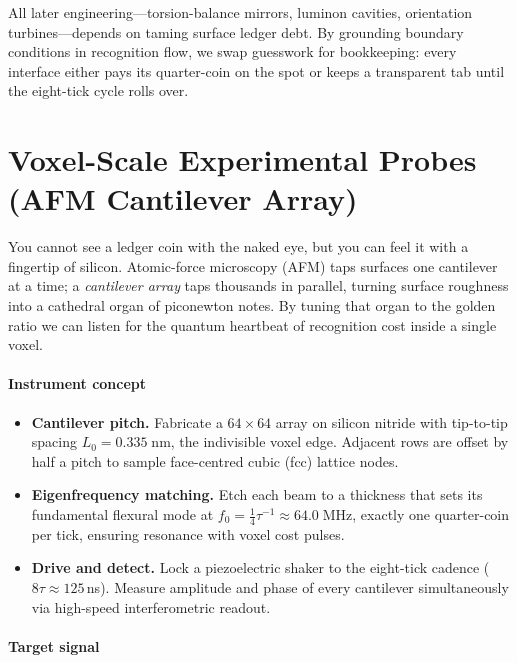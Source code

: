 \documentclass[11pt,oneside]{book}
\begin{document}
All later engineering—torsion-balance mirrors, luminon cavities,
orientation turbines—depends on taming surface ledger debt.  
By grounding boundary conditions in recognition flow, we swap guesswork
for bookkeeping: every interface either pays its quarter-coin on the
spot or keeps a transparent tab until the eight-tick cycle rolls over.

\section{Voxel-Scale Experimental Probes (AFM Cantilever Array)}
\label{sec:afm-voxel-probes}

You cannot see a ledger coin with the naked eye, but you can feel it with a fingertip of silicon.  
Atomic-force microscopy (AFM) taps surfaces one cantilever at a time; a \emph{cantilever array} taps thousands in parallel, turning surface roughness into a cathedral organ of piconewton notes.  
By tuning that organ to the golden ratio we can listen for the quantum heartbeat of recognition cost inside a single voxel.

\paragraph*{Instrument concept}

\begin{itemize}
\item \textbf{Cantilever pitch.}  
  Fabricate a $64\times64$ array on silicon nitride with tip-to-tip spacing
  $L_{0}=0.335\;\mathrm{nm}$, the indivisible voxel edge.  
  Adjacent rows are offset by half a pitch to sample face-centred cubic (fcc) lattice nodes.

\item \textbf{Eigenfrequency matching.}  
  Etch each beam to a thickness that sets its fundamental flexural mode at
  $f_0=\tfrac14\tau^{-1}\approx64.0\;\mathrm{MHz}$,  
  exactly one quarter-coin per tick, ensuring resonance with voxel cost pulses.

\item \textbf{Drive and detect.}  
  Lock a piezoelectric shaker to the eight-tick cadence
  ($8\tau\approx125\,$ns).  
  Measure amplitude and phase of every cantilever simultaneously via
  high-speed interferometric readout.
\end{itemize}

\paragraph*{Target signal}
\end{document}
